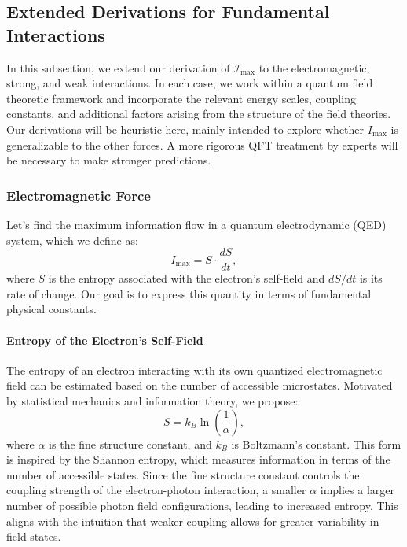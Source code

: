 \documentclass[12pt]{article}
\begin{document}
\subsection{Extended Derivations for Fundamental Interactions}

In this subsection, we extend our derivation of 
\(\mathcal{I}_{\max}\)
to the electromagnetic, strong, and weak interactions. In each case, we work within a quantum field theoretic framework and incorporate the relevant energy scales, coupling constants, and additional factors arising from the structure of the field theories. Our derivations will be heuristic here, mainly intended to explore whether $I_\text{max}$ is generalizable to the other forces. A more rigorous QFT treatment by experts will be necessary to make stronger predictions.

\subsubsection{Electromagnetic Force}

Let's find the maximum information flow in a quantum electrodynamic (QED) system, which we define as:
\begin{equation}
    I_{\max} = S \cdot \frac{dS}{dt},
\end{equation}
where $S$ is the entropy associated with the electron's self-field and $dS/dt$ is its rate of change. Our goal is to express this quantity in terms of fundamental physical constants.

\paragraph{Entropy of the Electron's Self-Field}

The entropy of an electron interacting with its own quantized electromagnetic field can be estimated based on the number of accessible microstates. Motivated by statistical mechanics and information theory, we propose:
\begin{equation}
    S = k_B \ln\left(\frac{1}{\alpha}\right),
\end{equation}
where $\alpha$ is the fine structure constant, and $k_B$ is Boltzmann’s constant. This form is inspired by the Shannon entropy, which measures information in terms of the number of accessible states. Since the fine structure constant controls the coupling strength of the electron-photon interaction, a smaller $\alpha$ implies a larger number of possible photon field configurations, leading to increased entropy. This aligns with the intuition that weaker coupling allows for greater variability in field states.
\end{document}
